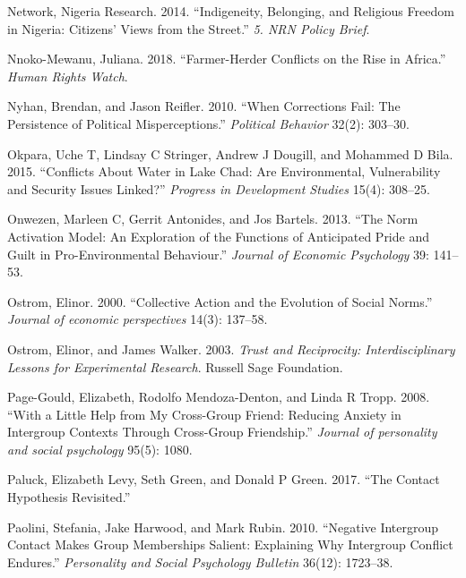 \documentclass[11pt]{article}
\begin{document}
\leavevmode\hypertarget{ref-nigeria2014freedom}{}%
Network, Nigeria Research. 2014. ``Indigeneity, Belonging, and Religious
Freedom in Nigeria: Citizens' Views from the Street.'' \emph{5. NRN
Policy Brief}.

\leavevmode\hypertarget{ref-hrc2018farmer}{}%
Nnoko-Mewanu, Juliana. 2018. ``Farmer-Herder Conflicts on the Rise in
Africa.'' \emph{Human Rights Watch}.

\leavevmode\hypertarget{ref-nyhan2010corrections}{}%
Nyhan, Brendan, and Jason Reifler. 2010. ``When Corrections Fail: The
Persistence of Political Misperceptions.'' \emph{Political Behavior}
32(2): 303--30.

\leavevmode\hypertarget{ref-okpara2015conflicts}{}%
Okpara, Uche T, Lindsay C Stringer, Andrew J Dougill, and Mohammed D
Bila. 2015. ``Conflicts About Water in Lake Chad: Are Environmental,
Vulnerability and Security Issues Linked?'' \emph{Progress in
Development Studies} 15(4): 308--25.

\leavevmode\hypertarget{ref-onwezen2013norm}{}%
Onwezen, Marleen C, Gerrit Antonides, and Jos Bartels. 2013. ``The Norm
Activation Model: An Exploration of the Functions of Anticipated Pride
and Guilt in Pro-Environmental Behaviour.'' \emph{Journal of Economic
Psychology} 39: 141--53.

\leavevmode\hypertarget{ref-ostrom2000collective}{}%
Ostrom, Elinor. 2000. ``Collective Action and the Evolution of Social
Norms.'' \emph{Journal of economic perspectives} 14(3): 137--58.

\leavevmode\hypertarget{ref-ostrom2003trust}{}%
Ostrom, Elinor, and James Walker. 2003. \emph{Trust and Reciprocity:
Interdisciplinary Lessons for Experimental Research}. Russell Sage
Foundation.

\leavevmode\hypertarget{ref-page2008little}{}%
Page-Gould, Elizabeth, Rodolfo Mendoza-Denton, and Linda R Tropp. 2008.
``With a Little Help from My Cross-Group Friend: Reducing Anxiety in
Intergroup Contexts Through Cross-Group Friendship.'' \emph{Journal of
personality and social psychology} 95(5): 1080.

\leavevmode\hypertarget{ref-paluck2017contact}{}%
Paluck, Elizabeth Levy, Seth Green, and Donald P Green. 2017. ``The
Contact Hypothesis Revisited.''

\leavevmode\hypertarget{ref-paolini2010negative}{}%
Paolini, Stefania, Jake Harwood, and Mark Rubin. 2010. ``Negative
Intergroup Contact Makes Group Memberships Salient: Explaining Why
Intergroup Conflict Endures.'' \emph{Personality and Social Psychology
Bulletin} 36(12): 1723--38.
\end{document}
